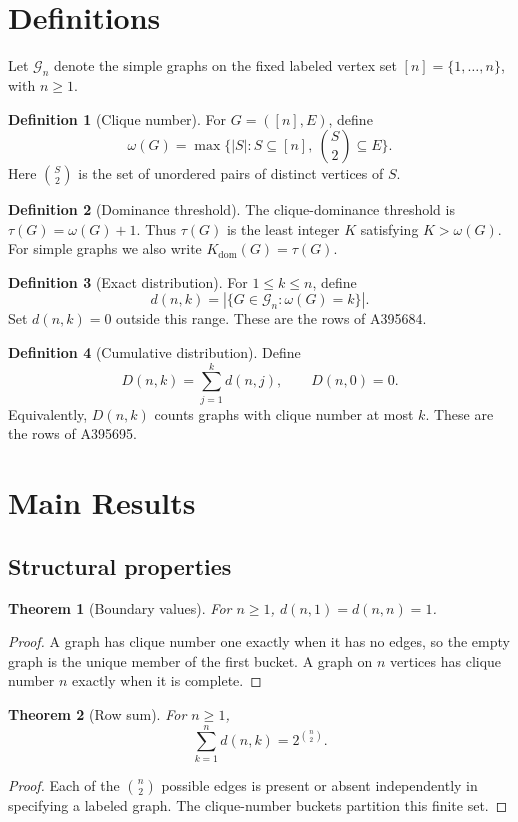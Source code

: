 \documentclass[11pt,a4paper]{article}
\newtheorem{theorem}{Theorem}[section]
\theoremstyle{definition}
\newtheorem{definition}{Definition}[section]
\newcommand{\Kdom}{K_{\mathrm{dom}}}
\newcommand{\Graph}{\mathcal G_n}
\begin{document}
\section{Definitions}
Let $\Graph$ denote the simple graphs on the fixed labeled vertex set
$[n]=\{1,\ldots,n\}$, with $n\geq1$.
\begin{definition}[Clique number]
For $G=([n],E)$, define
\[
 \omega(G)=\max\{|S|:S\subseteq[n],\ \binom S2\subseteq E\}.
\]
Here $\binom S2$ is the set of unordered pairs of distinct vertices
of $S$.
\end{definition}
\begin{definition}[Dominance threshold]
The clique-dominance threshold is $\tau(G)=\omega(G)+1$.
Thus $\tau(G)$ is the least integer $K$ satisfying $K>\omega(G)$.
For simple graphs we also write $\Kdom(G)=\tau(G)$.
\end{definition}
\begin{definition}[Exact distribution]
For $1\leq k\leq n$, define
\[
 d(n,k)=|\{G\in\Graph:\omega(G)=k\}|.
\]
Set $d(n,k)=0$ outside this range. These are the rows of A395684.
\end{definition}
\begin{definition}[Cumulative distribution]
Define
\[
 D(n,k)=\sum_{j=1}^{k}d(n,j),\qquad D(n,0)=0.
\]
Equivalently, $D(n,k)$ counts graphs with clique number at most $k$.
These are the rows of A395695.
\end{definition}

\section{Main Results}
\subsection{Structural properties}
\begin{theorem}[Boundary values]
For $n\geq1$, $d(n,1)=d(n,n)=1$.
\end{theorem}
\begin{proof}
A graph has clique number one exactly when it has no edges, so the
empty graph is the unique member of the first bucket. A graph on
$n$ vertices has clique number $n$ exactly when it is complete.
\end{proof}
\begin{theorem}[Row sum]
For $n\geq1$,
\[
 \sum_{k=1}^{n}d(n,k)=2^{\binom n2}.
\]
\end{theorem}
\begin{proof}
Each of the $\binom n2$ possible edges is present or absent independently
in specifying a labeled graph. The clique-number buckets partition
this finite set.
\end{proof}
\end{document}
